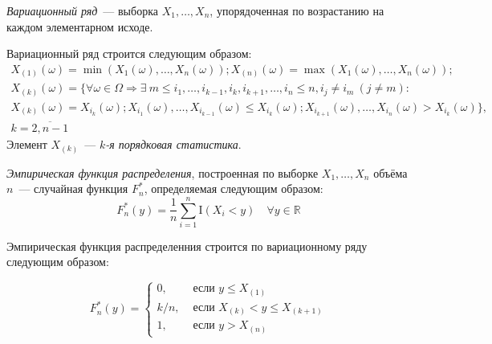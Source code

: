 

\begin{defn}
{\it Вариационный ряд}~--- выборка $X_{1}, \ldots, X_{n}$, упорядоченная по возрастанию на каждом элементарном исходе.
\end{defn}
Вариационный ряд строится следующим образом:
\begin{multline*}
    X_{(1)}(\omega)=\min (X_{1}(\omega), \ldots, X_{n}(\omega)); X_{(n)}(\omega)=\max (X_{1}(\omega), \ldots, X_{n}(\omega)); \\
    X_{(k)}(\omega)=\{\forall \omega \in \Omega \Rightarrow \exists~ m \leqslant i_{1}, \ldots, i_{k-1}, i_{k}, i_{k+1}, \ldots, i_{n} \leqslant n, i_{j} \neq i_{m}~ (j \neq m): \\ 
    X_{(k)}(\omega)=X_{i_{k}}(\omega);
    X_{i_{1}}(\omega), \ldots, X_{i_{k-1}}(\omega) \leqslant X_{i_{k}}(\omega); X_{i_{k+1}}(\omega), \ldots, X_{i_{n}}(\omega)>X_{i_{k}}(\omega)\}, \\
    k = \overline{2, n-1}
\end{multline*}
Элемент $X_{(k)}$~--- {\it $k$-я порядковая статистика}.

\begin{defn}
{\it Эмпирическая функция распределения}, построенная по выборке $X_{1}, \ldots, X_{n}$ объёма $n$~--- случайная функция $F_{n}^{*}$, определяемая следующим образом:
\begin{equation*}
    F_{n}^{*}(y) =\frac{1}{n} \sum\limits_{i=1}^{n} \mathrm{I}\left(X_{i}<y\right) \quad \forall y \in \mathbb{R}
\end{equation*}
\end{defn}

Эмпирическая функция распределенния строится по вариационному ряду следующим образом:

\begin{equation*}
    F_{n}^{*}(y)=\left\{\begin{array}{ll}
    0, & \text { если } y \leqslant X_{(1)} \\
    k/n, & \text { если } X_{(k)}<y \leqslant X_{(k+1)} \\
    1, & \text { если } y>X_{(n)}
    \end{array}\right.
\end{equation*}

